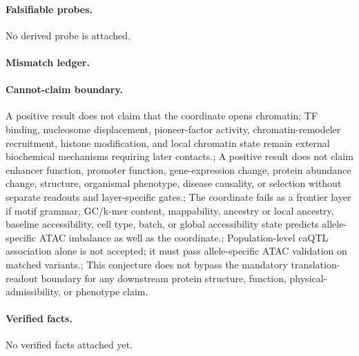 \paragraph{Falsifiable probes.}
No derived probe is attached.

\paragraph{Mismatch ledger.}
\paragraph{Cannot-claim boundary.} A positive result does not claim that the coordinate opens chromatin; TF binding, nucleosome displacement, pioneer-factor activity, chromatin-remodeler recruitment, histone modification, and local chromatin state remain external biochemical mechanisms requiring later contacts.; A positive result does not claim enhancer function, promoter function, gene-expression change, protein abundance change, structure, organismal phenotype, disease causality, or selection without separate readouts and layer-specific gates.; The coordinate fails as a frontier layer if motif grammar, GC/k-mer content, mappability, ancestry or local ancestry, baseline accessibility, cell type, batch, or global accessibility state predicts allele-specific ATAC imbalance as well as the coordinate.; Population-level caQTL association alone is not accepted; it must pass allele-specific ATAC validation on matched variants.; This conjecture does not bypass the mandatory translation-readout boundary for any downstream protein structure, function, physical-admissibility, or phenotype claim.

\paragraph{Verified facts.}
No verified facts attached yet.
